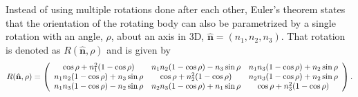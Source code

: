 Instead of using multiple rotations done  after each other, Euler's theorem states that the orientation of the rotating body can also be parametrized by a single rotation with an angle, $\rho$, about an axis in 3D, $\hat{\mathbf{n}} = (n_1, n_2, n_3)$. That rotation is denoted as $R(\hat{\mathbf{n}}, \rho)$ and is given by 
\begin{equation}
R ( \hat { \mathbf{n} } , \rho ) = \left( \begin{array} { c c c } { \cos \rho + n _ { 1 } ^ { 2 } ( 1 - \cos \rho ) } & { n _ { 1 } n _ { 2 } ( 1 - \cos \rho ) - n _ { 3 } \sin \rho } & { n _ { 1 } n _ { 3 } ( 1 - \cos \rho ) + n _ { 2 } \sin \rho } \\ { n _ { 1 } n _ { 2 } ( 1 - \cos \rho ) + n _ { 3 } \sin \rho } & { \cos \rho + n _ { 2 } ^ { 2 } ( 1 - \cos \rho ) } & { n _ { 2 } n _ { 3 } ( 1 - \cos \rho ) + n _ { 2 } \sin \rho } \\ { n _ { 1 } n _ { 3 } ( 1 - \cos \rho ) - n _ { 2 } \sin \rho } & { n _ { 2 } n _ { 3 } ( 1 - \cos \rho ) + n _ { 1 } \sin \rho } & { \cos \rho + n _ { 3 } ^ { 2 } ( 1 - \cos \rho ) } \end{array} \right).
\end{equation}


